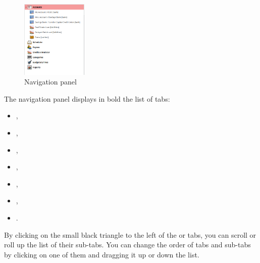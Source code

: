 \begin{figure}%
	\vspace{-\intextsep}				%
	\centering							%
	\includegraphics[width=0.28\textwidth]{image/screenshot/home_navigation}
	\vspace{-5pt}						%
	\captionsetup{%
	format=plain,					%
	name=Fig.,						%
	justification=centering,		%
	labelsep=newline				%
}
	\caption{Navigation panel}		%
	\vspace{-40pt}						%
	\label{home_navigation}
\end{figure}

The navigation panel displays in bold the list of tabs:
\begin{itemize}
	\item {},
	\item {},
	\item {},
	\item {},
	\item {},
	\item {},
	\item {}.
\end{itemize}
By clicking on the small black triangle to the left of the  or  tabs,  you can scroll or roll up the list of their sub-tabs. You can change the order of tabs and sub-tabs by clicking on one of them and dragging it up or down the list.


